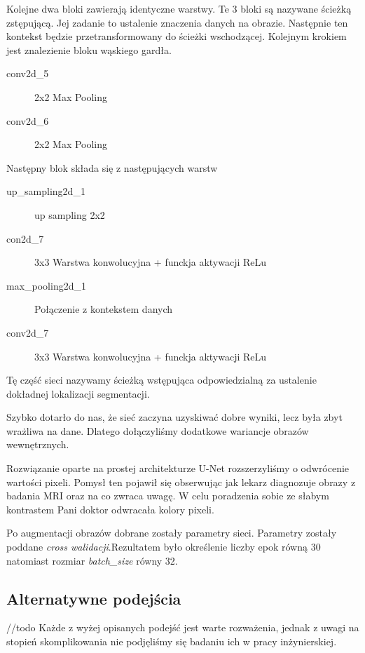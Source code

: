 \documentclass[a4paper,11pt,twoside]{report}
\theoremstyle{definition}
\begin{document}
Kolejne dwa bloki zawierają identyczne warstwy. Te 3 bloki są nazywane ścieżką zstępującą. Jej zadanie to ustalenie znaczenia danych na obrazie. Następnie ten kontekst będzie przetransformowany do ścieżki wschodzącej. Kolejnym krokiem jest znalezienie bloku wąskiego gardła. 

\begin{description}
	\item [conv2d\_5] 2x2 Max Pooling
	\item [conv2d\_6] 2x2 Max Pooling
\end{description}

Następny blok składa się z następujących warstw

\begin{description}
	\item [up\_sampling2d\_1] up sampling 2x2 
	\item [con2d\_7] 3x3 Warstwa konwolucyjna + funckja aktywacji ReLu
	\item [max\_pooling2d\_1] Połączenie z kontekstem danych
	\item [conv2d\_7] 3x3 Warstwa konwolucyjna + funckja aktywacji ReLu

\end{description}

Tę część sieci nazywamy ścieżką wstępująca odpowiedzialną za ustalenie dokładnej lokalizacji segmentacji.

\par 

Szybko dotarło do nas, że sieć zaczyna uzyskiwać dobre wyniki, lecz była zbyt wrażliwa na dane. Dlatego dołączyliśmy dodatkowe wariancje obrazów wewnętrznych.

Rozwiązanie oparte na prostej architekturze U-Net rozszerzyliśmy o odwrócenie wartości pixeli. Pomysł ten pojawił się obserwując jak lekarz diagnozuje obrazy z badania MRI oraz na co zwraca uwagę. W celu poradzenia sobie ze słabym kontrastem Pani doktor odwracała kolory pixeli.


Po augmentacji obrazów dobrane zostały parametry sieci. Parametry zostały poddane \textit{cross walidacji}.Rezultatem było określenie liczby epok równą 30 natomiast rozmiar \textit{batch\_size} równy 32.
\subsection{Alternatywne podejścia}
//todo
Każde z wyżej opisanych podejść jest warte rozważenia, jednak z uwagi na stopień skomplikowania nie podjęliśmy się badaniu ich w pracy inżynierskiej.
\end{document}
